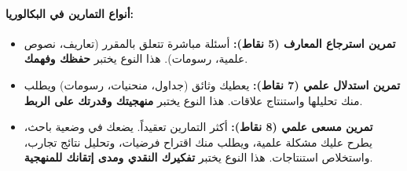 \documentclass[12pt,a4paper]{book}
\begin{document}
	\paragraph{أنواع التمارين في البكالوريا:}
	\begin{itemize}
		\item \textbf{تمرين استرجاع المعارف (5 نقاط):} أسئلة مباشرة تتعلق بالمقرر (تعاريف، نصوص علمية، رسومات). هذا النوع يختبر \textbf{حفظك وفهمك}.
		\item \textbf{تمرين استدلال علمي (7 نقاط):} يعطيك وثائق (جداول، منحنيات، رسومات) ويطلب منك تحليلها واستنتاج علاقات. هذا النوع يختبر \textbf{منهجيتك وقدرتك على الربط}.
		\item \textbf{تمرين مسعى علمي (8 نقاط):} أكثر التمارين تعقيداً. يضعك في وضعية باحث، يطرح عليك مشكلة علمية، ويطلب منك اقتراح فرضيات، وتحليل نتائج تجارب، واستخلاص استنتاجات. هذا النوع يختبر \textbf{تفكيرك النقدي ومدى إتقانك للمنهجية}.
	\end{itemize}
	
\end{document}
